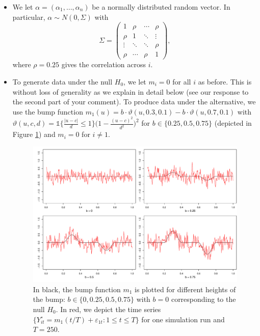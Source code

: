 \documentclass[a4paper,12pt]{article}
\newcommand{\ind}{\mathbb{1}}
\begin{document}
\begin{enumerate}[label=\arabic*.,leftmargin=0.6cm]
\begin{enumerate}[label=(\roman*),leftmargin=0.75cm,topsep=0pt]
\begin{itemize}[leftmargin=0.45cm,itemsep=0pt,topsep=0pt]
\item We let $\alpha = (\alpha_1,\ldots,\alpha_n)$ be a normally distributed random vector. In particular, $\alpha \sim N(0,\Sigma)$ with
\[ \Sigma =
\begin{pmatrix}
1      & \rho   & \cdots & \rho   \\
\rho   & 1      & \ddots & \vdots \\
\vdots & \ddots & \ddots & \rho   \\
\rho   & \cdots & \rho   & 1
\end{pmatrix},
\]
where $\rho = 0.25$ gives the correlation across $i$.

\item To generate data under the null $H_0$, we let $m_i = 0$ for all $i$ as before. This is without loss of generality as we explain in detail below (see our response to the second part of your comment). To produce data under the alternative, we use the bump function $m_1(u) =  b \cdot  \vartheta(u, 0.3, 0.1) - b  \cdot  \vartheta(u,0.7, 0.1)$ with $\vartheta(u,c,d) =  \ind\big\{\frac{|u - c|}{d}\leq 1\big\} \big(1 - \frac{(u - c)^2}{d^2}\big)^2$ for $b \in \{ 0.25, 0.5, 0.75 \}$ %
(depicted in Figure \ref{fig:bump_function}) and $m_i = 0$ for $i \neq 1$.

\begin{figure}[t!]
\includegraphics[width=\textwidth]{../output/bump_function.pdf}
\caption{In black, the bump function $m_1$ is plotted for different heights of the bump: $b \in \{0, 0.25, 0.5, 0.75\}$ with $b=0$ corresponding to the null $H_0$. In red, we depict the time series $\{Y_{it}^\circ = m_1(t/T) + \varepsilon_{1t}: 1 \le t \le T\}$ for one simulation run and $T=250$.}\label{fig:bump_function}


\end{figure}
\end{itemize}
\end{enumerate}
\end{enumerate}
\end{document}
